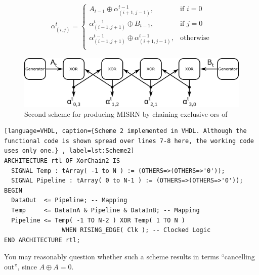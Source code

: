 \documentclass{article}
\newcommand{\xor}{\oplus}
\begin{document}
\begin{align}
\alpha^t_{(i,j)} = 
\begin{cases}
A_{t-1} \xor \alpha^{t-1}_{(i+1,j-1)}, & \text{if $i=0$}\\
\alpha^{t-1}_{(i-1,j+1)} \xor B_{t-1}, & \text{if $j=0$}\\
\alpha^{t-1}_{(i-1,j+1)} \xor \alpha^{t-1}_{(i+1,j-1)}, & \text{otherwise}\\
\end{cases}
\end{align}

\begin{figure}[ht]
\centering
\includegraphics[width=\textwidth]{MISRN2.png}
\caption{Second scheme for producing MISRN by chaining exclusive-ors of }
\label{fig:scheme2}
\end{figure}

\begin{minipage}{1.0\textwidth}
\centering
\begin{lstlisting}[language=VHDL, caption={Scheme 2 implemented in VHDL. Although the functional code is shown spread over lines 7-8 here, the working code uses only one.} , label=lst:Scheme2]
ARCHITECTURE rtl OF XorChain2 IS
  SIGNAL Temp : tArray( -1 to N ) := (OTHERS=>(OTHERS=>'0'));
  SIGNAL Pipeline : tArray( 0 to N-1 ) := (OTHERS=>(OTHERS=>'0'));
BEGIN
  DataOut  <= Pipeline; -- Mapping
  Temp     <= DataInA & Pipeline & DataInB; -- Mapping
  Pipeline <= Temp( -1 TO N-2 ) XOR Temp( 1 TO N )
                WHEN RISING_EDGE( Clk ); -- Clocked Logic
END ARCHITECTURE rtl;
\end{lstlisting}
\end{minipage}

You may reasonably question whether such a scheme results in terms ``cancelling out'', since $A \xor A = 0$.  
\end{document}
